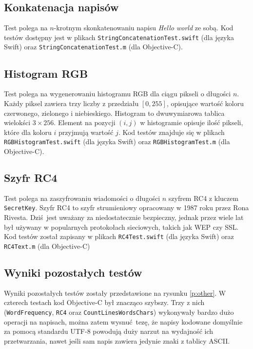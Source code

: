 \documentclass[mgr, shortabstract]{iithesis}
\begin{document}
\subsection{Konkatenacja napisów}

Test polega na $n$-krotnym skonkatenowaniu napisu \textit{Hello world} ze sobą. Kod testów dostępny jest w plikach \texttt{StringConcatenationTest.swift} (dla języka Swift) oraz \texttt{StringConcatenationTest.m} (dla Objective-C).

\subsection{Histogram RGB}

Test polega na wygenerowaniu histogramu RGB dla ciągu pikseli o długości $n$. Każdy piksel zawiera trzy liczby z przedziału $\left[0, 255\right]$, opisujące wartość koloru czerwonego, zielonego i niebieskiego. Histogram to dwuwymiarowa tablica wielokści $3 \times 256$. Element na pozycji $(i, j)$ w histogramie opisuje ilość pikseli, które dla koloru $i$ przyjmują wartość $j$. Kod testów znajduje się w plikach \texttt{RGBHistogramTest.swift} (dla języka Swift) oraz \texttt{RGBHistogramTest.m} (dla Objective-C).

\subsection{Szyfr RC4}

Test polega na zaszyfrowaniu wiadomości o długości $n$ szyfrem RC4 z kluczem \texttt{SecretKey}. Szyfr RC4 to szyfr strumieniowy opracowany w 1987 roku przez Rona Rivesta. Dziś jest uważany za niedostatecznie bezpieczny, jednak przez wiele lat był używany w popularnych protokołach sieciowych, takich jak WEP czy SSL. Kod testów został zapisany w plikach \texttt{RC4Test.swift} (dla języka Swift) oraz \texttt{RC4Text.m} (dla Objective-C)

\subsection{Wyniki pozostałych testów}

Wyniki pozostałych testów zostały przedstawione na rysunku \ref{p:other}. W czterech testach kod Objective-C był znacząco szybszy. Trzy z nich (\texttt{WordFrequency}, \texttt{RC4} oraz \texttt{CountLinesWordsChars}) wykonywały bardzo dużo operacji na napisach, można zatem wysnuć tezę, że napisy kodowane domyślnie za pomocą standardu UTF-8 powodują duży narzut na wydajność ich przetwarzania, nawet jeśli sam napis zawiera jedynie znaki z tablicy ASCII.
\end{document}
